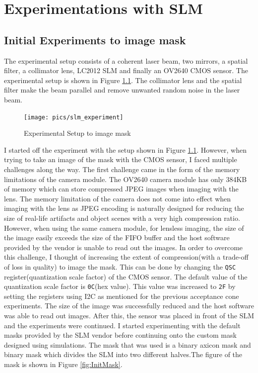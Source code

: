 \chapter{Experimentations with SLM}
\label{chp:SLM}
\section{Initial Experiments to image mask}
The experimental setup consists of a coherent laser beam, two mirrors, a spatial filter, a collimator lens, LC2012 SLM and finally an OV2640 CMOS sensor. The experimental setup is shown in Figure \ref{fig:experiment_slm}. The collimator lens and the spatial filter make the beam parallel and remove unwanted random noise in the laser beam.

\begin{figure}[htbp]
\centering
\texttt{[image: pics/slm\_experiment]}
\caption{Experimental Setup to image mask}
\label{fig:experiment_slm}
\end{figure}

I started off the experiment with the setup shown in Figure \ref{fig:experiment_slm}. However, when trying to take an image of the mask with the CMOS sensor, I faced multiple challenges along the way. The first challenge came in the form of the memory limitations of the camera module. The OV2640 camera module has only 384KB of memory which can store compressed JPEG images when imaging with the lens. The memory limitation of the camera does not come into effect when imaging with the lens as JPEG encoding is naturally designed for reducing the size of real-life artifacts and object scenes with a very high compression ratio. However, when using the same camera module, for lensless imaging, the size of the image easily exceeds the size of the FIFO buffer and the host software provided by the vendor is unable to read out the images. In order to overcome this challenge, I thought of increasing the extent of compression(with a trade-off of loss in quality) to image the mask. This can be done by changing the \texttt{QSC} register(quantization scale factor) \cite{OV2640DS} of the CMOS sensor. The default value of the quantization scale factor is \texttt{0C}(hex value). This value was increased to \texttt{2F} by setting the registers using I2C as mentioned for the previous acceptance cone experiments. The size of the image was successfully reduced and the host software was able to read out images. After this, the sensor was placed in front of the SLM and the experiments were continued. I started experimenting with the default masks provided by the SLM vendor before continuing onto the custom mask designed using simulations. The mask that was used is a binary axicon mask and binary mask which divides the SLM into two different halves.The figure of the mask is shown in Figure \ref{fig:InitMask}. 

